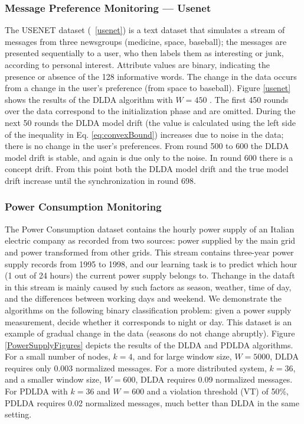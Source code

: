 \subsubsection{Message Preference Monitoring --- Usenet}
The USENET dataset (~\ref{usenet}) is a text dataset that simulates a stream of messages 
from three newsgroups (medicine, space, baseball); 
the messages are presented sequentially to a user, who then labels them as interesting or junk, 
according to personal interest. 
Attribute values are binary, indicating the presence or absence of the 128 informative words. 
The change in the data occurs from a change in the user's preference (from space to baseball). 
Figure \ref{usenet} shows the results of the DLDA algorithm with $W=450$ . The first 450 rounds over the data correspond to
the initialization phase and are omitted. During the next 50 rounds the DLDA model drift 
(the value is calculated using the left side of the inequality in Eq. \ref{eq:convexBound}) 
increases due to noise in the data; there is no change in the user's
preferences.
From round 500 to 600 the DLDA model drift is stable, and again is due only to the noise. In round 600 there is a concept
drift.
From this point both the DLDA model drift and the true model drift increase until the synchronization in round 698.
\subsubsection{Power Consumption Monitoring}
The Power Consumption dataset contains the hourly power supply of an
Italian electric company as recorded from two sources: power supplied
by the main grid and power transformed from other grids.
This stream contains three-year power supply records
from 1995 to 1998, and our learning task is to predict which hour (1 out of 24 hours) 
the current power supply belongs to. 
Thchange in the dataft in this stream is mainly caused by such factors as season, weather, time of day,
and the differences between working days and weekend.
We demonstrate the algorithms on the following binary classification problem:
given a power supply measurement, decide whether it corresponds to night or day.
This dataset is an example of gradual change in the data (seasons do not
change abruptly).
Figure \ref{PowerSupplyFigures} depicts the results of the DLDA
and PDLDA algorithms. For a small number of nodes, $k=4$, and for large
window size, $W=5000$, DLDA requires only 0.003 normalized messages.
For a more distributed system, $k=36$, and a smaller window
size, $W=600$, DLDA requires 0.09 normalized messages. For PDLDA with
$k=36$ and $W=600$ and a violation threshold (VT) of 50\%, PDLDA
requires 0.02 normalized messages, much better than DLDA in the same setting.

